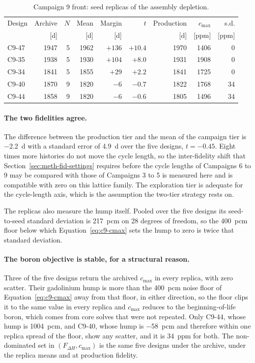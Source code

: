\begin{table}[htbp]
  \centering
  \small
  \caption{Campaign 9 front: seed replicas of the assembly depletion.}
  \label{tab:c9-dep-replicas}
  \begin{tabular}{@{}lrrrrrrrr@{}}
    \toprule
    Design & Archive & $N$ & Mean & Margin & $t$ & Production & $c_\mathrm{max}$ & s.d. \\
     & [d] & & [d] & [d] & & [d] & [ppm] & [ppm] \\
    \midrule
    C9-47 & 1947 & 5 & 1962 & $+136$ & $+10.4$ & 1970 & 1406 & 0 \\
    C9-35 & 1938 & 5 & 1930 & $+104$ & $+8.0$  & 1931 & 1908 & 0 \\
    C9-34 & 1841 & 5 & 1855 & $+29$  & $+2.2$  & 1841 & 1725 & 0 \\
    C9-40 & 1870 & 9 & 1820 & $-6$   & $-0.7$  & 1822 & 1768 & 34 \\
    C9-44 & 1858 & 9 & 1820 & $-6$   & $-0.6$  & 1805 & 1496 & 34 \\
    \bottomrule
  \end{tabular}
\end{table}

\paragraph{The two fidelities agree.}
The difference between the production tier and the mean of the campaign
tier is \SI{-2.2}{d} with a standard error of \SI{4.9}{d} over the five
designs, $t = -0.45$. Eight times more histories do not move the cycle
length, so the inter-fidelity shift that
Section~\ref{sec:meth-fid-settings} requires before the cycle lengths of
Campaigns 6 to 9 may be compared with those of Campaigns 3 to 5 is
measured here and is compatible with zero on this lattice family. The
exploration tier is adequate for the cycle-length axis, which is the
assumption the two-tier strategy rests on.

The replicas also measure the hump itself. Pooled over the five designs
its seed-to-seed standard deviation is \SI{217}{pcm} on 28 degrees of
freedom, so the \SI{400}{pcm} floor below which
Equation~\eqref{eq:c9-cmax} sets the hump to zero is twice that
standard deviation.

\paragraph{The boron objective is stable, for a structural reason.}
Three of the five designs return the archived $c_\mathrm{max}$ in every
replica, with zero scatter. Their gadolinium hump is more than the
\SI{400}{pcm} noise floor of Equation~\eqref{eq:c9-cmax} away from that
floor, in either direction, so the floor clips it to the same value in
every replica and $c_\mathrm{max}$ reduces to the beginning-of-life
boron, which comes from core solves that were not repeated. Only C9-44,
whose hump is \SI{1004}{pcm}, and C9-40, whose hump is \SI{-58}{pcm} and
therefore within one replica spread of the floor, show any scatter, and
it is \SI{34}{ppm} for both. The non-dominated set in
$(F_{\Delta H}, c_\mathrm{max})$ is the same five designs under the
archive, under the replica means and at production fidelity.

